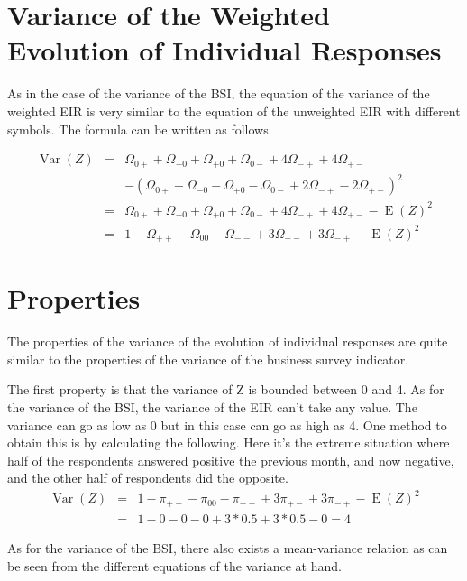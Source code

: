 \documentclass[12pt,a4paper,oneside]{book}
\DeclareMathOperator{\Var}{Var}
\DeclareMathOperator{\E}{E}
\begin{document}
\section{Variance of the Weighted Evolution of Individual Responses}

As in the case of the variance of the BSI, the equation of the variance of the weighted EIR is very similar to the equation of the unweighted EIR with different symbols. The formula can be written as follows 


\begin{eqnarray}
\Var(Z) &=& \Omega_{0+} + \Omega_{-0} + \Omega_{+0} + \Omega_{0-} +4\Omega_{-+} +4\Omega_{+-} \nonumber \nonumber \\ 
&&    - (\Omega_{0+} + \Omega_{-0} - \Omega_{+0} - \Omega_{0-} +2\Omega_{-+} -2\Omega_{+-})^2  \\
&=& \Omega_{0+} + \Omega_{-0} + \Omega_{+0} + \Omega_{0-} +4\Omega_{-+} +4\Omega_{+-} - \E(Z)^2  \\
&=& 1 - \Omega_{++} - \Omega_{00} - \Omega_{--} + 3\Omega_{+-} + 3\Omega_{-+} - \E(Z)^2
\end{eqnarray}


\section{Properties}

The properties of the variance of the evolution of individual responses are quite similar to the properties of the variance of the business survey indicator.

The first property is that the variance of Z is bounded between 0 and 4.
As for the variance of the BSI, the variance of the EIR can't take any value.
The variance can go as low as 0 but in this case can go as high as 4. One method to obtain this is by calculating the following. Here it's the extreme situation where half of the respondents answered positive the previous month, and now negative, and the other half of respondents did the opposite.
\begin{eqnarray}
\Var(Z) &=& 1 - \pi_{++} - \pi_{00} - \pi_{--} + 3\pi_{+-} + 3\pi_{-+} - \E(Z)^2 \nonumber \\
    &=& 1 - 0 - 0 - 0 + 3*0.5 + 3*0.5 - 0 = 4 \nonumber
\end{eqnarray}

As for the variance of the BSI, there also exists a mean-variance relation as can be seen from the different equations of the variance at hand.


\end{document}
